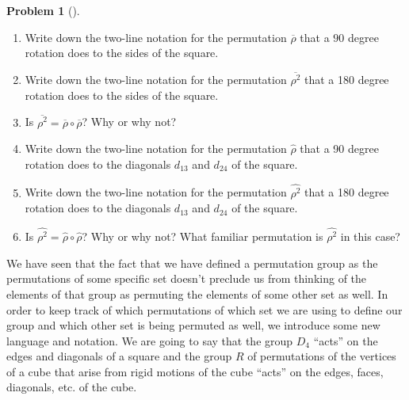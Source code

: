 \documentclass[10pt,]{book}
\theoremstyle{plain}
\theoremstyle{definition}
\newtheorem{activity}[project]{Problem}
\theoremstyle{definition}
\numberwithin{equation}{chapter}
\begin{document}
\begin{activity}[]\marginsymbol[-1em]{} \label{activity-279}
\leavevmode%
\begin{enumerate}[font=\bfseries,label=(\alph*),ref=\alph*]
\item\label{task-199} \marginsymbol[-2.5em]{} \hypertarget{p-1577}{}%
Write down the two-line notation for the permutation \(\overline{\rho}\) that a \(90\) degree rotation does to the sides of the square.%
\item\label{task-200} \marginsymbol[-2.5em]{} \hypertarget{p-1579}{}%
Write down the two-line notation for the permutation \(\overline{\rho^2}\) that  a 180 degree rotation does to the sides of the square.%
\item\label{task-201} \marginsymbol[-2.5em]{} \hypertarget{p-1581}{}%
Is \(\overline{\rho^2} = \overline\rho\circ\overline\rho\)? Why or why not?%
\item\label{task-202} \marginsymbol[-2.5em]{} \hypertarget{p-1583}{}%
Write down the two-line notation for the permutation \(\widehat{\rho}\) that a 90 degree rotation does to the diagonals \(d_{13}\) and \(d_{24}\) of the square.%
\item\label{task-203} \marginsymbol[-2.5em]{} \hypertarget{p-1585}{}%
Write down the two-line notation for the permutation \(\widehat{\rho^2}\) that a 180 degree rotation does to the diagonals \(d_{13}\) and \(d_{24}\) of the square.%
\item\label{task-204} \marginsymbol[-2.5em]{} \hypertarget{p-1587}{}%
Is \(\widehat{\rho^2} = \widehat{\rho}\circ\widehat{\rho}\)? Why or why not? What familiar permutation is \(\widehat{\rho^2}\) in this case?%
\end{enumerate}
\end{activity}
\hypertarget{p-1589}{}%
We have seen that the fact that we have defined a permutation group as the permutations of some specific set doesn't preclude us from thinking of the elements of that group as permuting the elements of some other set as well. In order to keep track of which permutations of which set we are using to define our group and which other set is being permuted as well, we introduce some new language and notation. We are going to say that the group \(D_4\) ``acts'' on the edges and diagonals of a square and the group \(R\) of permutations of the vertices of a cube that arise from rigid motions of the cube ``acts'' on the edges, faces, diagonals, etc. of the cube.%
\end{document}
